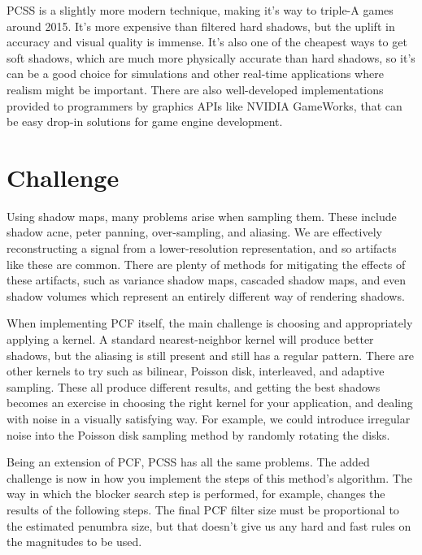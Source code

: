 \documentclass{article}
\begin{document}
PCSS is a slightly more modern technique, making it's way to triple-A games around 2015. It's more expensive than filtered hard shadows, but the uplift in accuracy and visual quality is immense. It's also one of the cheapest ways to get soft shadows, which are much more physically accurate than hard shadows, so it's can be a good choice for simulations and other real-time applications where realism might be important. There are also well-developed implementations provided to programmers by graphics APIs like NVIDIA GameWorks, that can be easy drop-in solutions for game engine development.


\section{Challenge}

Using shadow maps, many problems arise when sampling them. These include shadow acne, peter panning, over-sampling, and aliasing. We are effectively reconstructing a signal from a lower-resolution representation, and so artifacts like these are common. There are plenty of methods for mitigating the effects of these artifacts, such as variance shadow maps, cascaded shadow maps, and even shadow volumes which represent an entirely different way of rendering shadows.

When implementing PCF itself, the main challenge is choosing and appropriately applying a kernel. A standard nearest-neighbor kernel will produce better shadows, but the aliasing is still present and still has a regular pattern. There are other kernels to try such as bilinear, Poisson disk, interleaved, and adaptive sampling. These all produce different results, and getting the best shadows becomes an exercise in choosing the right kernel for your application, and dealing with noise in a visually satisfying way. For example, we could introduce irregular noise into the Poisson disk sampling method by randomly rotating the disks.

Being an extension of PCF, PCSS has all the same problems. The added challenge is now in how you implement the steps of this method's algorithm. The way in which the blocker search step is performed, for example, changes the results of the following steps. The final PCF filter size must be proportional to the estimated penumbra size, but that doesn't give us any hard and fast rules on the magnitudes to be used.
\end{document}
